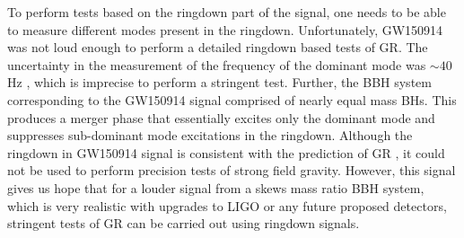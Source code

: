 
To perform tests based on the ringdown part of the signal, one needs to be able to measure different modes present in the ringdown.  Unfortunately, GW150914 was not loud enough to perform a detailed ringdown based tests of GR. The uncertainty in the measurement of the frequency of the dominant mode was $\sim 40$ Hz \cite{TheLIGOScientific:2016src}, which is imprecise to perform a stringent test. Further, the BBH system corresponding to the GW150914 signal comprised of nearly equal mass BHs. This produces a merger phase that essentially excites only the dominant mode and suppresses sub-dominant mode excitations in the ringdown.  Although the ringdown in GW150914 signal is consistent with the prediction of GR \cite{TheLIGOScientific:2016src}, it could not be used to perform precision tests of strong field gravity. However, this signal gives us hope that for a  louder signal from a skews mass ratio BBH system, which is very realistic with upgrades to LIGO or any future proposed detectors, stringent tests of GR can be carried out using ringdown signals. 



